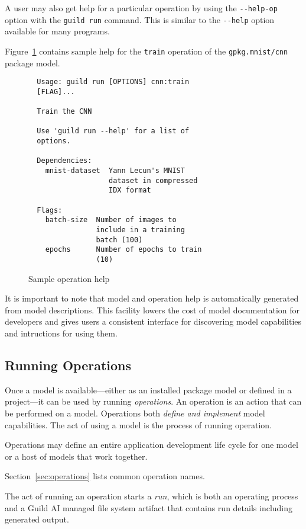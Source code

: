 \documentclass{article}
\begin{document}
A user may also get help for a particular operation by using the
\verb|--help-op| option with the \verb|guild run| command. This is
similar to the \verb|--help| option available for many programs.

Figure~\ref{fig:op-help} contains sample help for the \verb|train|
operation of the \verb|gpkg.mnist/cnn| package model.

\begin{figure}
  \begin{lstlisting}
  Usage: guild run [OPTIONS] cnn:train
  [FLAG]...

  Train the CNN

  Use 'guild run --help' for a list of
  options.

  Dependencies:
    mnist-dataset  Yann Lecun's MNIST
                   dataset in compressed
                   IDX format

  Flags:
    batch-size  Number of images to
                include in a training
                batch (100)
    epochs      Number of epochs to train
                (10)
  \end{lstlisting}
  \caption{Sample operation help}
  \label{fig:op-help}
\end{figure}

It is important to note that model and operation help is automatically
generated from model descriptions. This facility lowers the cost of
model documentation for developers and gives users a consistent
interface for discovering model capabilities and intructions for using
them.

\subsection{Running Operations}

Once a model is available---either as an installed package model or
defined in a project---it can be used by running \emph{operations}. An
operation is an action that can be performed on a model. Operations
both \emph{define and implement} model capabilities. The act of using
a model is the process of running operation.

Operations may define an entire application development life cycle for
one model or a host of models that work together.

Section~\ref{sec:operations} lists common operation names.

The act of running an operation starts a \emph{run}, which is both an
operating process and a Guild AI managed file system artifact that
contains run details including generated output.
\end{document}
